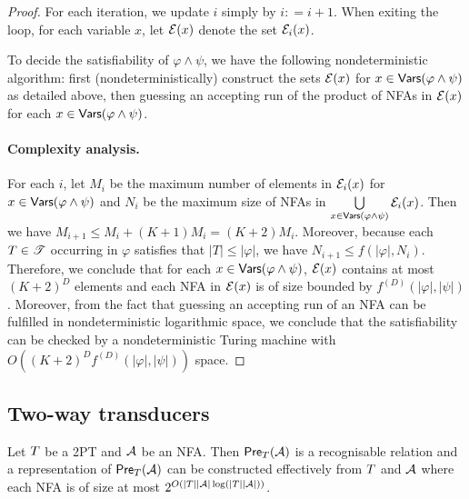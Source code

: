\begin{proof}
For each iteration, we update $i$ simply by  $i: = i+1$.
%
When exiting the loop, for each variable $x$, let $\mathcal{E}(x)$ denote the set $\mathcal{E}_i(x)$.

To decide the satisfiability of $\varphi \wedge \psi$, we have the following nondeterministic algorithm: first (nondeterministically) construct the sets $\mathcal{E}(x)$ for $x \in \mathsf{Vars}(\varphi \wedge \psi)$ as detailed above, then 
guessing an accepting run of the product of NFAs in $\mathcal{E}(x)$ for each $x \in \mathsf{Vars}(\varphi \wedge \psi)$.


\paragraph{Complexity analysis.} For each $i$, let $M_i$ be the maximum number of elements in $\mathcal{E}_i(x)$ for $x  \in \mathsf{Vars}(\varphi \wedge \psi)$ and $N_i$ be the maximum size of NFAs in $\bigcup \limits_{x \in \mathsf{Vars}(\varphi \wedge \psi)} \mathcal{E}_i(x)$. Then we have $M_{i+1} \le M_i + (K+1)M_i = (K+2) M_i$. Moreover,  because each $T \in \mathscr{T}$ occurring in $\varphi$ satisfies that $|T| \le |\varphi|$, we have $N_{i+1} \le f(|\varphi|, N_i)$. Therefore, we conclude that for each $x \in \mathsf{Vars}(\varphi \wedge \psi)$, $\mathcal{E}(x)$ contains at most $(K+2)^D$ elements and each NFA in $\mathcal{E}(x)$ is of size bounded by $f^{(D)}(|\varphi|, |\psi|)$. Moreover, 
from the fact that guessing an accepting run of an NFA can be fulfilled in nondeterministic logarithmic space, we conclude that the satisfiability can be checked by a nondeterministic Turing machine with %
$O((K+2)^D f^{(D)}(|\varphi|, |\psi|))$ space.
\end{proof}

\subsection{Two-way transducers}



\begin{lemma}\label{lem-2pt}
Let $T$ be a 2PT and $\mathcal{A}$ be an NFA. Then $\textsf{Pre}_{T}(\mathcal{A})$ is a recognisable relation and a representation of $\textsf{Pre}_{T}(\mathcal{A})$ can be constructed effectively from $T$ and $\mathcal{A}$ where each NFA is of size at most $2^{O(|T||\mathcal{A}|\log (|T||\mathcal{A}|))}$.
\end{lemma}

